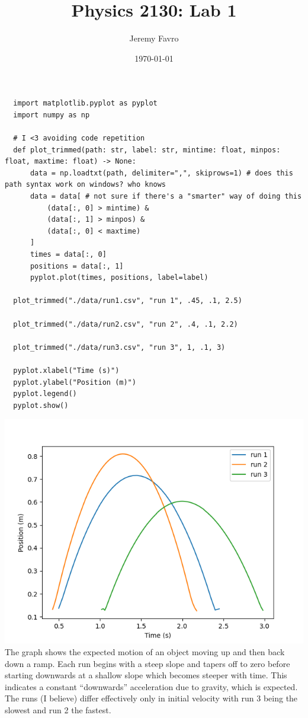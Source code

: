 \documentclass[10pt]{article}
\title{Physics 2130: Lab 1}
\author{Jeremy Favro}
\date{\today}
\theoremstyle{definition}
\begin{document}
\maketitle

\begin{verbatim}
  import matplotlib.pyplot as pyplot
  import numpy as np
  
  # I <3 avoiding code repetition
  def plot_trimmed(path: str, label: str, mintime: float, minpos: float, maxtime: float) -> None:
      data = np.loadtxt(path, delimiter=",", skiprows=1) # does this path syntax work on windows? who knows
      data = data[ # not sure if there's a "smarter" way of doing this
          (data[:, 0] > mintime) & 
          (data[:, 1] > minpos) & 
          (data[:, 0] < maxtime)
      ]
      times = data[:, 0]
      positions = data[:, 1]
      pyplot.plot(times, positions, label=label)
  
  plot_trimmed("./data/run1.csv", "run 1", .45, .1, 2.5)
  
  plot_trimmed("./data/run2.csv", "run 2", .4, .1, 2.2)
  
  plot_trimmed("./data/run3.csv", "run 3", 1, .1, 3)
  
  pyplot.xlabel("Time (s)")
  pyplot.ylabel("Position (m)")
  pyplot.legend()
  pyplot.show()
\end{verbatim}

\includegraphics{Figure_1.png}\\
The graph shows the expected motion of an object moving up and then back down a ramp. Each run begins with a steep slope and tapers off to zero before starting
downwards at a shallow slope which becomes steeper with time. This indicates a constant ``downwards'' acceleration due to gravity, which is expected. 
The runs (I believe) differ effectively only in initial velocity with run 3 being the slowest and run 2 the fastest.
\end{document}

